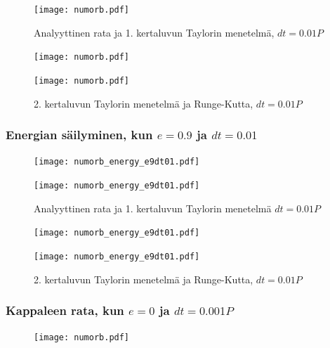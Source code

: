 \documentclass[12pt, a4paper]{article}
\begin{document}
\begin{figure}[H]%
\vspace*{-2.5cm}
\texttt{[image: numorb.pdf]}%
\caption{Analyyttinen rata ja 1. kertaluvun Taylorin menetelmä, $dt=0.01P$}
\end{figure}\label{t1e09}

\newpage
\begin{figure}[H]%
\texttt{[image: numorb.pdf]}%
\end{figure}\label{t2e09}

\begin{figure}[H]%
\vspace*{-2.5cm}
\texttt{[image: numorb.pdf]}%
\caption{2. kertaluvun Taylorin menetelmä ja Runge-Kutta, $dt=0.01P$}
\end{figure}\label{rk4e09}

\newpage
\subsubsection{Energian säilyminen, kun $e=0.9$ ja $dt=0.01$}
\begin{figure}[H]
\vspace*{-1cm}
\texttt{[image: numorb\_energy\_e9dt01.pdf]}
\end{figure}

\begin{figure}[H]%
\vspace*{-2cm}
\texttt{[image: numorb\_energy\_e9dt01.pdf]}%
\caption{Analyyttinen rata ja 1. kertaluvun Taylorin menetelmä $dt=0.01P$}
\end{figure}

\newpage
\begin{figure}[H]%
\texttt{[image: numorb\_energy\_e9dt01.pdf]}%
\end{figure}

\begin{figure}[H]%
\vspace*{-2cm}
\texttt{[image: numorb\_energy\_e9dt01.pdf]}%
\caption{2. kertaluvun Taylorin menetelmä ja Runge-Kutta, $dt=0.01P$}
\end{figure}

\newpage
\subsubsection{Kappaleen rata, kun $e=0$ ja $dt=0.001P$}
\begin{figure}[H]
\vspace*{-1.5cm}
\texttt{[image: numorb.pdf]}
\end{figure}
\end{document}
